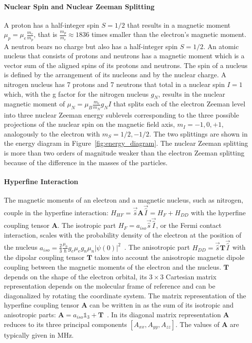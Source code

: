 \paragraph*{Nuclear Spin and Nuclear Zeeman Splitting}
A proton has a half-integer spin $S=1/2$ that results in a magnetic moment $\mu_p = \mu_e\frac{m_e}{m_p}$, that is $\frac{m_p}{m_e}\approx1836$ times smaller than the electron's magnetic moment. A neutron bears no charge but also has a half-integer spin $S=1/2$. An atomic nucleus that consists of protons and neutrons has a magnetic moment which is a vector sum of the aligned spins of its protons and neutrons. The spin of a nucleus is defined by the arrangement of its nucleons and by the nuclear charge. A nitrogen nucleus has 7 protons and 7 neutrons that total in a nuclear spin $I=1$ which, with the g factor for the nitrogen nucleus $g_N$, results in the nuclear magnetic moment of $\mu_N=\mu_B\frac{m_e}{m_N}g_NI$ that splits each of the electron Zeeman level into three nuclear Zeeman energy sublevels corresponding to the three possible projections of the nuclear spin on the magnetic field axis, $m_I=-1,0,+1$, analogously to the electron with $m_S=1/2,-1/2$. The two splittings are shown in the energy diagram in Figure~\ref{fig:energy_diagram}. The nuclear Zeeman splitting is more than two orders of magnitude weaker than the electron Zeeman splitting because of the difference in the masses of the particles.

\paragraph*{Hyperfine Interaction}
The magnetic moments of an electron and a magnetic nucleus, such as nitrogen, couple in the hyperfine interaction: $H_{HF}=\vec{\hat{s}}\textbf{A}\vec{\hat{I}}=H_F+H_{DD}$ with the hyperfine coupling tensor $\textbf{A}$. The isotropic part $H_F=a_{iso}\vec{\hat{s}}\vec{\hat{I}}$, or the Fermi contact interaction, scales with the probability density of the electron at the position of the nucleus $a_{iso}=\frac{2}{3}\frac{\mu_0}{\hbar}g_e\mu_eg_n\mu_n\vert\psi(0)\vert^2$~\cite{Schweiger2001}. The anisotropic part $H_{DD}=\vec{\hat{s}}\textbf{T}\vec{\hat{I}}$ with the dipolar coupling tensor $\textbf{T}$ takes into account the anisotropic magnetic dipole coupling between the magnetic moments of the electron and the nucleus. $\textbf{T}$ depends on the shape of the electron orbital, its $3\times3$ Cartesian matrix representation depends on the molecular frame of reference and can be diagonalized by rotating the coordinate system. The matrix representation of the hyperfine coupling tensor $\textbf{A}$ can be written in as the sum of its isotropic and anisotropic parts: $\textbf{A}=a_{iso}\mathds{1}_3 + \textbf{T}$~\cite{Weil_Bolton}. In its diagonal matrix representation $\textbf{A}$ reduces to its three principal components $[A_{xx}, A_{yy}, A_{zz}]$. The values of $\textbf{A}$ are typically given in MHz.


